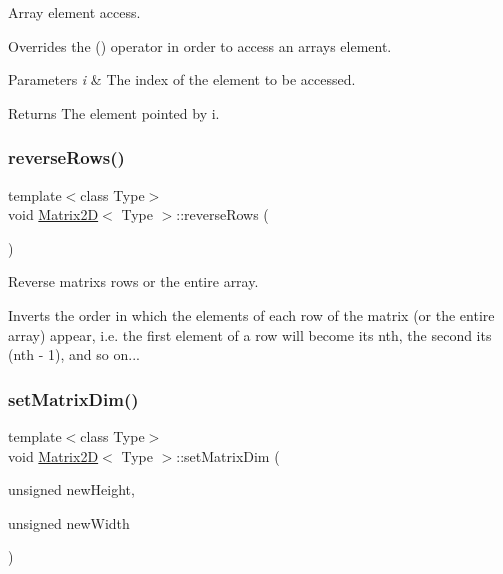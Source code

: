 Array element access. 

Overrides the {\ttfamily ()} operator in order to access an array\textquotesingle{}s element. 
\begin{DoxyParams}{Parameters}
{\em i} & The index of the element to be accessed. \\
\hline
\end{DoxyParams}
\begin{DoxyReturn}{Returns}
The element pointed by i. 
\end{DoxyReturn}
\mbox{\label{classMatrix2D_aaaefe293f1a0549afb2e506b71b18490}} 
\subsubsection{\texorpdfstring{reverse\+Rows()}{reverseRows()}}
{\footnotesize\ttfamily template$<$class Type$>$ \\
void \hyperlink{classMatrix2D}{Matrix2D}$<$ Type $>$\+::reverse\+Rows (\begin{DoxyParamCaption}{ }\end{DoxyParamCaption})\hspace{0.3cm}{\ttfamily [inline]}}



Reverse matrix\textquotesingle{}s rows or the entire array. 

Inverts the order in which the elements of each row of the matrix (or the entire array) appear, i.\+e. the first element of a row will become its nth, the second its (nth -\/ 1), and so on... \mbox{\label{classMatrix2D_abf7025332a5f4f75b172fb1a3ad56176}} 
\subsubsection{\texorpdfstring{set\+Matrix\+Dim()}{setMatrixDim()}\hspace{0.1cm}{\footnotesize\ttfamily [1/2]}}
{\footnotesize\ttfamily template$<$class Type$>$ \\
void \hyperlink{classMatrix2D}{Matrix2D}$<$ Type $>$\+::set\+Matrix\+Dim (\begin{DoxyParamCaption}\item[{unsigned}]{new\+Height,  }\item[{unsigned}]{new\+Width }\end{DoxyParamCaption})\hspace{0.3cm}{\ttfamily [inline]}}



